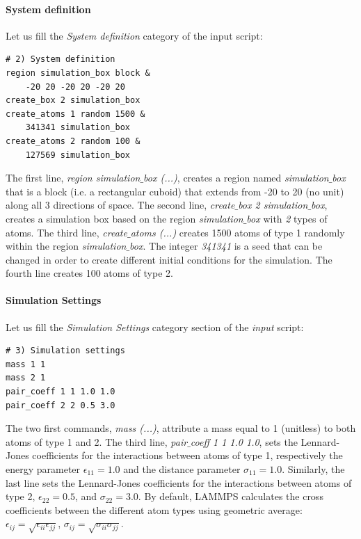 \documentclass[9pt,tutorial]{livecoms}
\begin{document}
\paragraph{System definition}
Let us fill the \textit{System definition} category of the input script:
{\normalsize \begin{verbatim}
# 2) System definition
region simulation_box block &
    -20 20 -20 20 -20 20
create_box 2 simulation_box
create_atoms 1 random 1500 &
    341341 simulation_box
create_atoms 2 random 100 &
    127569 simulation_box
\end{verbatim}}
\noindent The first line, \textit{region simulation$\_$box (...)}, creates a region named \textit{simulation$\_$box} that is a block (i.e. a rectangular cuboid) that extends from -20 to 20 (no unit) along all 3 directions of space. The second line, \textit{create$\_$box 2 simulation$\_$box}, creates a simulation box based on the region \textit{simulation$\_$box} with \textit{2} types of atoms. The third line, \textit{create$\_$atoms (...)} creates 1500 atoms of type 1 randomly within the region \textit{simulation$\_$box}. The integer \textit{341341} is a seed that can be changed in order to create different
initial conditions for the simulation. The fourth line creates 100 atoms of type 2.

\paragraph{Simulation Settings}
Let us fill the \textit{Simulation Settings} category section of the \textit{input} script:
{\normalsize \begin{verbatim}
# 3) Simulation settings
mass 1 1
mass 2 1
pair_coeff 1 1 1.0 1.0
pair_coeff 2 2 0.5 3.0
\end{verbatim}}
The two first commands, \textit{mass (...)}, attribute a mass equal to 1 (unitless) to both atoms of type 1 and 2. The third line, \textit{pair$\_$coeff 1 1 1.0 1.0}, sets the Lennard-Jones coefficients for the interactions between atoms of type 1, respectively the energy parameter $\epsilon_{11} = 1.0$ and the distance parameter $\sigma_{11} = 1.0$. Similarly, the last line sets the Lennard-Jones coefficients for the interactions between atoms of type 2, $\epsilon_{22} = 0.5$, and $\sigma_{22} = 3.0$. By default, LAMMPS calculates the cross coefficients between the different atom types using geometric average: $\epsilon_{ij} = \sqrt{\epsilon_{ii} \epsilon_{jj}}$, $\sigma_{ij} = \sqrt{\sigma_{ii} \sigma_{jj}}$. 
\end{document}
